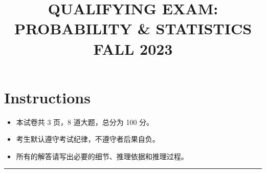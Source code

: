 \documentclass[11pt,a4paper]{article}
\title{\textbf{QUALIFYING EXAM: PROBABILITY \& STATISTICS}\\[0.5em]\Large FALL 2023}
\date{}
\author{}
\begin{document}
\maketitle
\vspace{-3em}

\section*{Instructions}
\begin{itemize}
    \item 本试卷共 3 页，8 道大题，总分为 100 分。
    \item 考生默认遵守考试纪律，不遵守者后果自负。
    \item 所有的解答请写出必要的细节、推理依据和推理过程。
\end{itemize}

\noindent\rule{\linewidth}{0.4pt}
\end{document}
